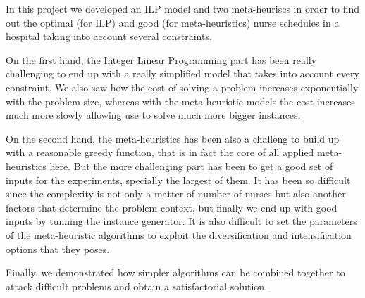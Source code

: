 
In this project we developed an ILP model and two meta-heuriscs in order to find out the optimal (for ILP) and good (for meta-heuristics) nurse schedules in a hospital taking into account several constraints.

On the first hand, the Integer Linear Programming part has been really challenging to end up with a really simplified model that takes into account every constraint. We also saw how the cost of solving a problem increases exponentially with the problem size, whereas with the meta-heuristic models the cost increases much more slowly allowing use to solve much more bigger instances.

On the second hand, the meta-heuristics has been also a challeng to build up with a reasonable greedy function, that is in fact the core of all applied meta-heuristics here. But the more challenging part has been to get a good set of inputs for the experiments, specially the largest of them. It has been so difficult since the complexity is not only a matter of number of nurses but also another factors that determine the problem context, but finally we end up with good inputs by tunning the instance generator. It is also difficult to set the parameters of the meta-heuristic algorithms to exploit the diversification and intensification options that they poses.

Finally, we demonstrated how simpler algorithms can be combined together to attack difficult problems and obtain a satisfactorial solution.

\pagebreak